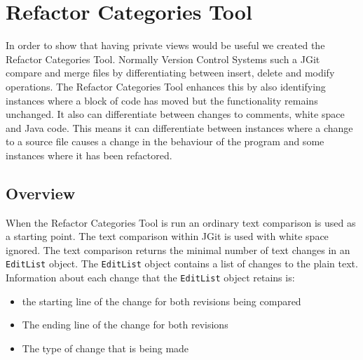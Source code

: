 
\chapter{Refactor Categories Tool}
In order to show that having private views would be useful we created the Refactor Categories Tool. Normally Version Control Systems such a JGit compare and merge files by differentiating between insert, delete and modify operations. The Refactor Categories Tool enhances this by also identifying instances where a block of code has moved but the functionality remains unchanged. It also can differentiate between changes to comments, white space and Java code. This means it can differentiate between instances where a change to a source file causes a change in the behaviour of the program and some instances where it has been refactored.  



\section{Overview}
When the Refactor Categories Tool is run an ordinary text comparison is used as a starting point.
The text comparison within JGit is used with white space ignored.
\label{matchingTextWithAST} The text comparison returns the minimal number of text changes in an \lstinline{EditList} object. 
The \lstinline{EditList} object contains a list of changes to the plain text. Information about each change that the \lstinline{EditList} object retains is:

\begin{itemize}
  \item the starting line of the change for both revisions being compared
  \item The ending line of the change for both revisions 
  \item The type of change that is being made
\end{itemize}

